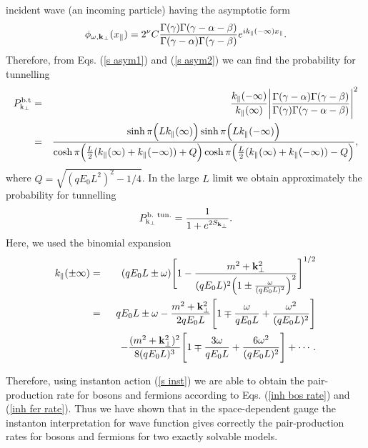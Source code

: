 \documentclass[a4paper,prd,showpacs,preprintnumbers,amsmath,amssymb]{revtex4}
\begin{document}
incident wave (an incoming particle) having the asymptotic form
\begin{equation}
\phi_{\omega, {\bf k}_{\perp}} (x_{\parallel}) = 2^{\nu} C
\frac{\Gamma(\gamma) \Gamma(\gamma - \alpha -
\beta)}{\Gamma(\gamma - \alpha) \Gamma(\gamma - \beta)} e^{i
k_{\parallel} (- \infty) x_{\parallel}}. \label{s asym2}
\end{equation}
Therefore, from Eqs. (\ref{s asym1}) and (\ref{s asym2}) we can
find the probability for tunnelling
\begin{eqnarray}
P^{\rm b.t}_{{\rm k}_{\perp}} &=& \frac{k_{\parallel} (-
\infty)}{k_{\parallel} (\infty)} \Biggl|\frac{\Gamma(\gamma -
\alpha) \Gamma(\gamma - \beta)}{\Gamma(\gamma) \Gamma(\gamma -
\alpha - \beta)} \Biggr|^2 \nonumber\\ &=& \frac{\sinh \pi \Bigl(L
k_{\parallel} (\infty)\Bigr) \sinh \pi \Bigl(L k_{\parallel}
(-\infty)\Bigr)}{\cosh \pi \Bigl(\frac{L}{2} (k_{\parallel}
(\infty) + k_{\parallel} (- \infty) ) + Q\Bigr) \cosh \pi
\Bigl(\frac{L}{2} (k_{\parallel} (\infty)+ k_{\parallel} (-
\infty)) - Q \Bigr)},
\end{eqnarray}
where $Q = \sqrt{(q E_0 L^2)^2 - 1/4}$. In the large $L$ limit we
obtain approximately the probability for tunnelling
\begin{equation}
P^{\rm b. ~tun.}_{{\rm k}_{\perp}} = \frac{1}{1 + e^{2 S_{{\bf
k}_{\perp}}}}.
\end{equation}
Here, we used the binomial expansion
\begin{eqnarray}
k_{\parallel} (\pm \infty) &=& (qE_0L \pm \omega) \Biggl[ 1 -
\frac{m^2 + {\bf k}_{\perp}^2}{(qE_0L)^2 \Bigl(1 \pm
\frac{\omega}{(qE_0L)^2}\Bigr)^2} \Biggr]^{1/2} \nonumber\\ &=&
qE_0 L \pm \omega - \frac{m^2 + {\bf k}_{\perp}^2}{2qE_0L} \Biggl[
1 \mp \frac{\omega}{qE_0L} + \frac{\omega^2}{(qE_0L)^2}\Biggr]
\nonumber\\ && \quad - \frac{(m^2 + {\bf
k}_{\perp}^2)^2}{8(qE_0L)^3} \Biggl[ 1 \mp \frac{3\omega}{qE_0L} +
\frac{6\omega^2}{(qE_0L)^2}\Biggr] + \cdots .
\end{eqnarray}





Therefore, using instanton action (\ref{s inst}) we are able to
obtain the pair-production rate for bosons and fermions according
to Eqs. (\ref{inh bos rate}) and (\ref{inh fer rate}). Thus we
have shown that in the space-dependent gauge the instanton
interpretation for wave function gives correctly the
pair-production rates for bosons and fermions for two exactly
solvable models.
\end{document}
